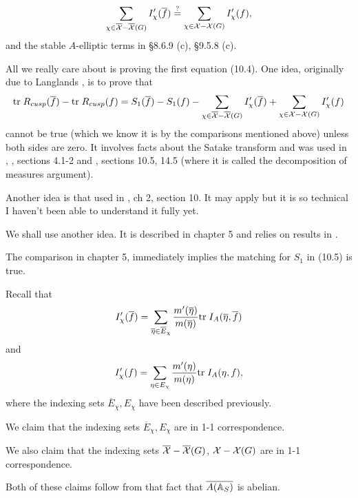 \begin{equation}
\sum_{\chi \in \overline{{\cal X}}-\overline{{\cal X}}(G)}
I_\chi ^{\prime }(\overline{f})\stackrel{?}{=}
\sum_{\chi \in {\cal X}-{\cal X}(G)}I_\chi^{\prime }(f),
\end{equation}
and the stable $A$-elliptic terms in \S 8.6.9 (c), \S 9.5.8 (c).
\begin{remark}
All we really care about is proving the first equation (10.4). One idea,
originally due to Langlands \cite{L4}, is to prove that 
\[
{\rm tr}\;R_{cusp}(\overline{f})-{\rm tr}\;R_{cusp}(f)=S_1(\overline{f}%
)-S_1(f)-\sum_{\chi \in \overline{{\cal X}}-\overline{{\cal X}}(G)}I_\chi
^{\prime }(\overline{f})+\sum_{\chi \in {\cal X}-{\cal X}(G)}I_\chi ^{\prime
}(f)
\]
cannot be true (which we know it is by the comparisons mentioned above)
unless both sides are zero. It involves facts about the Satake transform and
was used in \cite{L4}, \cite{Fl}, sections 4.1-2
and \cite{R}, sections 10.5, 14.5 (where it is called the
decomposition of measures argument).

Another idea is that used in \cite{AC}, ch 2, section 10.
It may apply but it is
so technical I haven't been able to understand it fully yet.

We shall use another idea. It is described in chapter 5
and relies on results in \cite{A6}.
\end{remark}

The comparison in chapter 5,
immediately implies the matching for $S_1$ in (10.5) is true.

Recall that
\begin{equation}
I_\chi ^{\prime }(\overline{f})=
\sum_{\overline{\eta }\in \overline{E}_\chi }
\frac{m^{\prime }(\overline{\eta })}{m(\overline{\eta })}
{\rm tr}\;I_A(\overline{\eta },\overline{f})
\end{equation}
and 
\begin{equation}
I_\chi ^{\prime }(f)=\sum_{\eta \in E_\chi }\frac{m^{\prime
}(\eta )}{m(\eta )}{\rm tr}\;I_A(\eta ,f),
\end{equation}
where the indexing sets $\overline{E}_\chi ,E_\chi $ have been described
previously. 

We claim that the indexing sets $\overline{E}_\chi ,E_\chi $ are in 1-1
correspondence.

We also claim that the indexing sets
$\overline{{\cal X}}-\overline{{\cal X}}(G)$,
${\cal X}-{\cal X}(G)$ are in 1-1 correspondence.

Both of these claims follow from that fact that
$\overline{A({\Bbb{A}}_S)}$ is
abelian.

